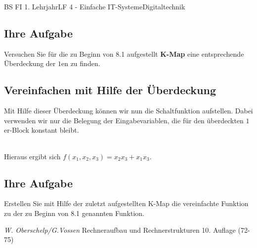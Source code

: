 \documentclass[11pt,twocolumn,oneside,openany,headings=optiontotoc,11pt,numbers=noenddot]{article}
\begin{document}
\begin{worksheet}{BS FI 1. Lehrjahr}{LF 4 - Einfache IT-Systeme}{Digitaltechnik}
		\subsection*{Ihre Aufgabe} Versuchen Sie für die zu Beginn von 8.1 aufgestellt \textbf{K-Map} eine entsprechende Überdeckung der \(1\)en zu finden.
		\subsection{Vereinfachen mit Hilfe der Überdeckung}
		Mit Hilfe dieser Überdeckung können wir nun die Schaltfunktion aufstellen. Dabei verwenden wir nur die Belegung der Eingabevariablen, die für den überdeckten \(1\)er-Block konstant bleibt.\\
		\par\noindent
		\begin{karnaugh-map}[4][2][1][$x_2x_1$][$x_3$]
		\end{karnaugh-map}\\
		Hieraus ergibt sich \(f(x_1,x_2,x_3) = x_2x_3 + x_1x_3\).
		\subsection*{Ihre Aufgabe} Erstellen Sie mit Hilfe der zuletzt aufgestellten K-Map die vereinfachte Funktion zu der zu Beginn von 8.1 genannten Funktion.\\
		\par\noindent
		\tiny{\color{codegray}\textit{W. Oberschelp/G.Vossen} Rechneraufbau und Rechnerstrukturen 10. Auflage (72-75)}
	\end{worksheet}
\end{document}
